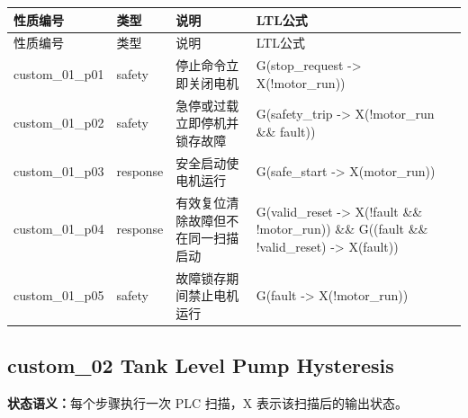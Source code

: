 \begin{longtable}{L{2.3cm}L{1.7cm}L{4.1cm}L{5.2cm}}

\toprule

性质编号 & 类型 & 说明 & LTL公式\\

\midrule

\endfirsthead

\toprule

性质编号 & 类型 & 说明 & LTL公式\\

\midrule

\endhead

{\ttfamily custom\_01\_p01} & safety & 停止命令立即关闭电机 & {\ttfamily G(stop\_request -> X(!motor\_run))}\\

{\ttfamily custom\_01\_p02} & safety & 急停或过载立即停机并锁存故障 & {\ttfamily G(safety\_trip -> X(!motor\_run \&\& fault))}\\

{\ttfamily custom\_01\_p03} & response & 安全启动使电机运行 & {\ttfamily G(safe\_start -> X(motor\_run))}\\

{\ttfamily custom\_01\_p04} & response & 有效复位清除故障但不在同一扫描启动 & {\ttfamily G(valid\_reset -> X(!fault \&\& !motor\_run)) \&\& G((fault \&\& !valid\_reset) -> X(fault))}\\

{\ttfamily custom\_01\_p05} & safety & 故障锁存期间禁止电机运行 & {\ttfamily G(fault -> X(!motor\_run))}\\

\bottomrule

\end{longtable}

\subsection{{\ttfamily custom\_02} Tank Level Pump Hysteresis}

\noindent\textbf{状态语义：}每个步骤执行一次 PLC 扫描，X 表示该扫描后的输出状态。

